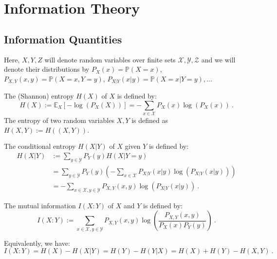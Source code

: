 \section{Information Theory}
\subsection{Information Quantities}
Here, $X,Y,Z$ will denote random variables over finite sets $\mathcal{X},\mathcal{Y},\mathcal{Z}$ and we will denote their distributions by $P_X(x) = \mathbb{P}(X=x)$, $P_{X,Y}(x,y) = \mathbb{P}(X=x,Y=y)$, $P_{X|Y}(x|y) = \mathbb{P}(X=x|Y=y), \ldots$
\begin{definition}
   The (Shannon) entropy $H(X)$ of $X$ is defined by:
   \[ H(X) := \mathbb{E}_X[-\log(P_X(X))] = -\sum_{x \in \mathcal{X}}P_X(x)\log(P_X(x))\ . \]
   The entropy of two random variables $X,Y$ is defined as $H(X,Y) := H((X,Y))$.
\end{definition}

\begin{definition}
  The conditional entropy $H(X|Y)$ of $X$ given $Y$ is defined by:
   \begin{equation}
      \begin{aligned}
        H(X|Y) &:=  \sum_{y \in \mathcal{Y}}P_Y(y)H(X|Y=y)\\
        &=  \sum_{y \in \mathcal{Y}}P_Y(y)\left(-\sum_{x \in \mathcal{X}}P_{X|Y}(x|y)\log(P_{X|Y}(x|y)) \right)\\
        &= -\sum_{x \in \mathcal{X}, y \in \mathcal{Y}}P_{X,Y}(x,y)\log(P_{X|Y}(x|y)) \ .
        \end{aligned}
     \end{equation}
\end{definition}

\begin{definition}
  The mutual information $I(X:Y)$ of $X$ and $Y$ is defined by:
    \[ I(X:Y) := \sum_{x \in \mathcal{X}, y \in \mathcal{Y}}P_{X,Y}(x,y)\log\left(\frac{P_{X,Y}(x,y)}{P_X(x)P_Y(y)}\right)\ .\]
\end{definition}

\begin{proposition}
Equivalently, we have:
\[ I(X:Y) = H(X) - H(X|Y) = H(Y) - H(Y|X) = H(X) + H(Y) - H(X,Y) \ .\]
\end{proposition}

